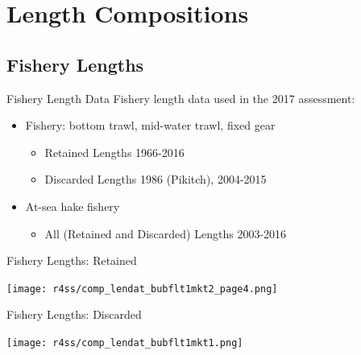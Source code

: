 \documentclass[pdf]{beamer}\usepackage[]{graphicx}\usepackage[]{color}
\begin{document}

\section{Length Compositions}
\subsection{Fishery Lengths}
\begin{frame}{Fishery Length Data}
  Fishery length data used in the 2017 assessment:
  \begin{itemize}
    \item Fishery: bottom trawl, mid-water trawl, fixed gear
      \begin{itemize}
        \item Retained Lengths 1966-2016
        \item Discarded Lengths 1986 (Pikitch), 2004-2015
      \end{itemize}
    \item At-sea hake fishery
      \begin{itemize}
        \item All (Retained and Discarded) Lengths 2003-2016
      \end{itemize}
  \end{itemize}
\end{frame}

\begin{frame}{Fishery Lengths: Retained}
  \begin{center}
    \texttt{[image: r4ss/comp\_lendat\_bubflt1mkt2\_page4.png]}
  \end{center}
\end{frame}

\begin{frame}{Fishery Lengths: Discarded}
  \begin{center}
    \texttt{[image: r4ss/comp\_lendat\_bubflt1mkt1.png]}
  \end{center}
\end{frame}
\end{document}
